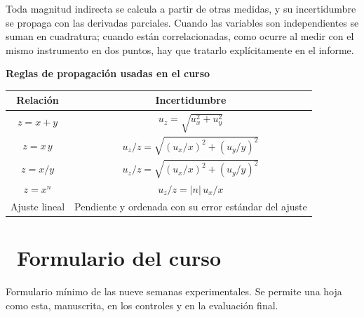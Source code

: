 \documentclass[11pt,a4paper]{article}
\newcommand{\iconotexto}[2]{\textcolor{cyanNeon}{\faIcon{#1}}~#2}
\begin{document}
Toda magnitud indirecta se calcula a partir de otras medidas, y su incertidumbre se propaga con las derivadas parciales. Cuando las variables son independientes se suman en cuadratura; cuando están correlacionadas, como ocurre al medir con el mismo instrumento en dos puntos, hay que tratarlo explícitamente en el informe.

\begin{center}
\begin{minipage}{\linewidth}
\centering
{\small
\textbf{Reglas de propagación usadas en el curso}\par\smallskip
\begin{tabular}{@{}cc@{}}
\toprule
Relación & Incertidumbre \\
\midrule
$z = x + y$ & $u_z = \sqrt{u_x^2 + u_y^2}$ \\
$z = x\,y$ & $u_z/z = \sqrt{(u_x/x)^2 + (u_y/y)^2}$ \\
$z = x/y$ & $u_z/z = \sqrt{(u_x/x)^2 + (u_y/y)^2}$ \\
$z = x^n$ & $u_z/z = |n|\,u_x/x$ \\
Ajuste lineal & Pendiente y ordenada con su error estándar del ajuste \\
\bottomrule
\end{tabular}
}\par{}
\end{minipage}
\end{center}

\section{\iconotexto{paperclip}{Formulario del curso}}

Formulario mínimo de las nueve semanas experimentales. Se permite una hoja como esta, manuscrita, en los controles y en la evaluación final.
\end{document}

